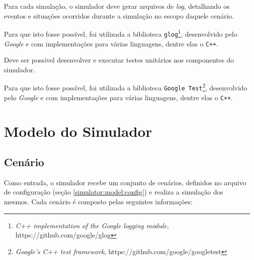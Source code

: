 \begin{description}[leftmargin=!,labelwidth=\widthof{\bfseries Determinístico}]
  \item[Rastreável]

  Para cada simulação, o simulador deve gerar arquivos de \textit{log},
  detalhando os eventos e situações ocorridos durante a simulação no escopo
  daquele cenário.

  Para que isto fosse possível, foi utilizada a biblioteca
  \texttt{glog}\footnote{\textit{C++ implementation of the Google logging
  module}, https://github.com/google/glog}, desenvolvido pelo \textit{Google} e
  com implementações para várias linguagens, dentre elas o \texttt{C++}.

  \item[Testável]

  Deve ser possível desenvolver e executar testes unitários nos componentes do
  simulador.

  Para que isto fosse possível, foi utilizada a biblioteca \texttt{Google
  Test}\footnote{\textit{Google's C++ test framework},
  https://github.com/google/googletest}, desenvolvido pelo \textit{Google} e
  com implementações para várias linguagens, dentre elas o \texttt{C++}.

\end{description}

\section{\label{simulator:model}Modelo do Simulador}

\subsection{\label{simulator:model:scenario}Cenário}

Como entrada, o simulador recebe um conjunto de cenários, definidos no arquivo
de configuração (seção \ref{simulator:model:config}) e realiza a simulação dos
mesmos. Cada cenário é composto pelas seguintes informações:

